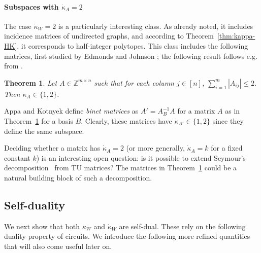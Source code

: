 \documentclass[11pt, a4paper]{article}
\newcommand{\Le}{\kappa}
\newcommand{\1}{\mathbbm{1}}
\newcommand{\kd}{{\dot{\kappa}}}
\newtheorem{theorem}{Theorem}[section]
\theoremstyle{case}
\newcommand{\Z}{\mathbb{Z}}
\begin{document}
\paragraph{Subspaces with $\dot\kappa_A=2$}The case $\kd_W=2$ is a particularly interesting class. As already noted, it includes incidence matrices of undirected graphs, and according to Theorem~\ref{thm:kappa-HK}, it corresponds to half-integer polytopes. This class includes the following matrices, first studied by Edmonds and Johnson \cite{Edmonds1970}; the following result follows e.g. from \cite{Appa04,Gerards1986,Hochbaum1993}.
\begin{theorem}\label{thm:edmonds-johnson}
Let $A\in\Z^{m\times n}$ such that for each column $j\in [n]$, $\sum_{i=1}^m|A_{ij}| \leq 2$. Then $\dot{\kappa}_A\in \{1,2\}$. 
\end{theorem}

Appa and Kotnyek \cite{Appa04} define \emph{binet matrices} as $A'=A_B^{-1} A$ for a matrix $A$ as in Theorem~\ref{thm:edmonds-johnson} for a basis $B$. Clearly, these matrices have $\kd_{A'}\in \{1,2\}$ since they define the same subspace. 

Deciding whether a matrix has $\kd_A=2$ (or more generally, $\kd_A=k$ for a fixed constant $k$) is an interesting open question: is it possible to extend Seymour's decomposition~\cite{Seymour1980} from TU matrices? The matrices in Theorem~\ref{thm:edmonds-johnson} could be a natural building block of such a decomposition.

\subsection{Self-duality}\label{sec:self-dual}
We next show that both $\Le_W$ and $\kd_W$ are self-dual.
These rely on the following duality property of circuits.
We introduce the following more refined quantities that will also come useful later on.
\end{document}
